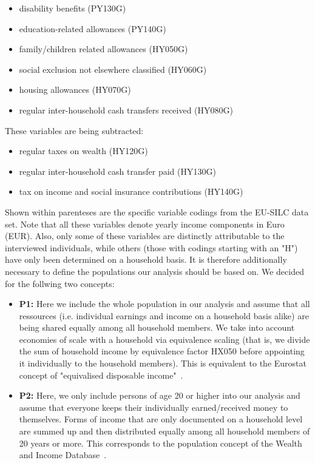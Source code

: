 \documentclass[a4paper]{article}\usepackage[]{graphicx}\usepackage[]{color}
\begin{document}
\begin{enumerate}
\begin{itemize}
  \item disability benefits (PY130G) 
  \item	education-related allowances (PY140G)
  \item family/children related allowances (HY050G)
  \item social exclusion not elsewhere classified (HY060G) 
  \item housing allowances (HY070G) 
  \item regular inter-household cash transfers received (HY080G)
\end{itemize}
These variables are being subtracted:
\begin{itemize}
  \item regular taxes on wealth (HY120G)
  \item	regular inter-household cash transfer paid (HY130G) 
  \item	tax on income and social insurance contributions (HY140G)
\end{itemize}

\end{enumerate}
Shown within parenteses are the specific variable codings from the EU-SILC data set. Note that all these variables denote yearly income components in Euro (EUR). Also, only some of these variables are distinctly attributable to the interviewed individuals, while others (those with codings starting with an "H") have only been determined on a household basis. It is therefore additionally necessary to define the populations our analysis should be based on. We decided for the follwing two concepts:
\begin{itemize}
\item \textbf{P1:} Here we include the whole population in our analysis and assume that all ressources (i.e. individual earnings and income on a household basis alike) are being shared equally among all household members. We take into account economies of scale with a household via equivalence scaling (that is, we divide the sum of household income by equivalence factor HX050 before appointing it individually to the household members). This is equivalent to the Eurostat concept of "equivalised disposable income"~\parencite{eurostat1}.
\item \textbf{P2:} Here, we only include persons of age 20 or higher into our analysis and assume that everyone keeps their individually earned/received money to themselves. Forms of income that are only documented on a household level are summed up and then distributed equally among all household members of 20 years or more. This corresponds to the population concept of the Wealth and Income Database~\parencite{widworld1}.
\end{itemize}
\end{document}
